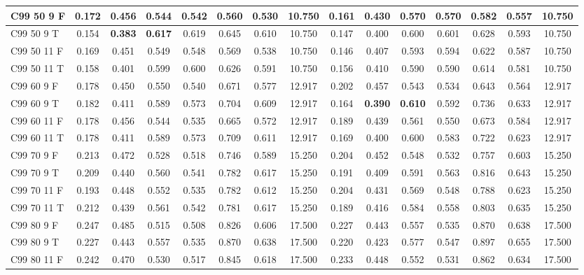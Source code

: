 \documentclass{article}
\begin{document}
\begin{longtable}[c]{|l|c|c|c|c|c|c|c||c|c|c|c|c|c|c|}
C99 50  9 F & 0.172 & 0.456 & 0.544 & 0.542 & 0.560 & 0.530 & 10.750 & 0.161 & 0.430 & 0.570 & 0.570 & 0.582 & 0.557 & 10.750\\ \hline
C99 50  9 T & 0.154 & \textbf{0.383} & \textbf{0.617} & 0.619 & 0.645 & 0.610 & 10.750 & 0.147 & 0.400 & 0.600 & 0.601 & 0.628 & 0.593 & 10.750\\ \hline
C99 50 11 F & 0.169 & 0.451 & 0.549 & 0.548 & 0.569 & 0.538 & 10.750 & 0.146 & 0.407 & 0.593 & 0.594 & 0.622 & 0.587 & 10.750\\ \hline
C99 50 11 T & 0.158 & 0.401 & 0.599 & 0.600 & 0.626 & 0.591 & 10.750 & 0.156 & 0.410 & 0.590 & 0.590 & 0.614 & 0.581 & 10.750\\ \hline
C99 60  9 F & 0.178 & 0.450 & 0.550 & 0.540 & 0.671 & 0.577 & 12.917 & 0.202 & 0.457 & 0.543 & 0.534 & 0.643 & 0.564 & 12.917\\ \hline
C99 60  9 T & 0.182 & 0.411 & 0.589 & 0.573 & 0.704 & 0.609 & 12.917 & 0.164 & \textbf{0.390} & \textbf{0.610} & 0.592 & 0.736 & 0.633 & 12.917\\ \hline
C99 60 11 F & 0.178 & 0.456 & 0.544 & 0.535 & 0.665 & 0.572 & 12.917 & 0.189 & 0.439 & 0.561 & 0.550 & 0.673 & 0.584 & 12.917\\ \hline
C99 60 11 T & 0.178 & 0.411 & 0.589 & 0.573 & 0.709 & 0.611 & 12.917 & 0.169 & 0.400 & 0.600 & 0.583 & 0.722 & 0.623 & 12.917\\ \hline
C99 70  9 F & 0.213 & 0.472 & 0.528 & 0.518 & 0.746 & 0.589 & 15.250 & 0.204 & 0.452 & 0.548 & 0.532 & 0.757 & 0.603 & 15.250\\ \hline
C99 70  9 T & 0.209 & 0.440 & 0.560 & 0.541 & 0.782 & 0.617 & 15.250 & 0.191 & 0.409 & 0.591 & 0.563 & 0.816 & 0.643 & 15.250\\ \hline
C99 70 11 F & 0.193 & 0.448 & 0.552 & 0.535 & 0.782 & 0.612 & 15.250 & 0.204 & 0.431 & 0.569 & 0.548 & 0.788 & 0.623 & 15.250\\ \hline
C99 70 11 T & 0.212 & 0.439 & 0.561 & 0.542 & 0.781 & 0.617 & 15.250 & 0.189 & 0.416 & 0.584 & 0.558 & 0.803 & 0.635 & 15.250\\ \hline
C99 80  9 F & 0.247 & 0.485 & 0.515 & 0.508 & 0.826 & 0.606 & 17.500 & 0.227 & 0.443 & 0.557 & 0.535 & 0.870 & 0.638 & 17.500\\ \hline
C99 80  9 T & 0.227 & 0.443 & 0.557 & 0.535 & 0.870 & 0.638 & 17.500 & 0.220 & 0.423 & 0.577 & 0.547 & 0.897 & 0.655 & 17.500\\ \hline
C99 80 11 F & 0.242 & 0.470 & 0.530 & 0.517 & 0.845 & 0.618 & 17.500 & 0.233 & 0.448 & 0.552 & 0.531 & 0.862 & 0.634 & 17.500\\ \hline

\end{longtable}
\end{document}

